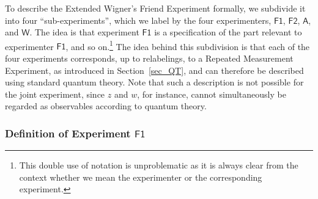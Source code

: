 \documentclass{article}
\theoremstyle{plain}
\theoremstyle{definition}
\newcommand*{\Friendone}{\mathsf{F1}}
\newcommand*{\Friendtwo}{\mathsf{F2}}
\newcommand*{\Assistant}{\mathsf{A}}
\newcommand*{\Wigner}{\mathsf{W}}
\begin{document}
To describe the Extended Wigner's Friend Experiment formally, we subdivide it into four ``sub-experiments'', which we label by the four experimenters,  $\Friendone$, $\Friendtwo$, $\Assistant$, and $\Wigner$. The idea is that experiment $\Friendone$ is a specification of the part relevant to experimenter $\Friendone$, and so on.\footnote{This double use of notation is unproblematic as it is always clear from the context whether we mean the experimenter or the corresponding experiment.} The  idea behind this subdivision is that each of the four experiments corresponds, up to relabelings, to a Repeated Measurement Experiment, as introduced in Section~\ref{sec_QT}, and can therefore be described using standard quantum theory. Note that such a description is not possible for the joint experiment, since $z$ and $w$, for instance, cannot  simultaneously be regarded as observables according to quantum theory.

\subsubsection*{Definition of Experiment $\Friendone$}
\end{document}
